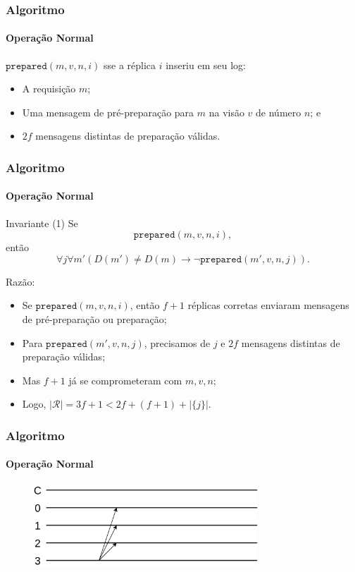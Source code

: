 \documentclass{beamer}
\begin{document}
\begin{frame}
  \frametitle{Algoritmo}
  \framesubtitle{Operação Normal}

  $\texttt{prepared}(m, v, n, i)$ sse a réplica $i$ inseriu em seu log:
  \begin{itemize}
      \pause
    \item
      A requisição $m$;

      \pause
    \item
      Uma mensagem de pré-preparação para $m$ na visão $v$ de número $n$; e

      \pause
    \item
      $2f$ mensagens distintas de preparação válidas.
  \end{itemize}
\end{frame}

\begin{frame}
  \frametitle{Algoritmo}
  \framesubtitle{Operação Normal}

  \begin{block}{Invariante (1)}
    Se $$\texttt{prepared}(m, v, n, i),$$ então $$\forall j \forall m' (D(m') \neq D(m) \to \lnot \texttt{prepared}(m', v, n, j)).$$
  \end{block}

  Razão:
  \begin{itemize}
      \pause
    \item
      Se $\texttt{prepared}(m, v, n, i)$, então $f + 1$ réplicas corretas enviaram mensagens de pré-preparação ou preparação;

      \pause
    \item
      Para $\texttt{prepared}(m', v, n, j)$, precisamos de $j$ e $2f$ mensagens distintas de preparação válidas;

      \pause
    \item
      Mas $f + 1$ já se comprometeram com $m, v, n$;
      
      \pause
    \item
      Logo, $|\mathcal{R}| = 3f + 1 < 2f + (f + 1) + |\{j\}|$.
  \end{itemize}
\end{frame}

\begin{frame}
  \frametitle{Algoritmo}
  \framesubtitle{Operação Normal}

  \begin{figure}
    \includegraphics[width=0.75\textwidth]{images/prepare}
  \end{figure}
\end{frame}
\end{document}
